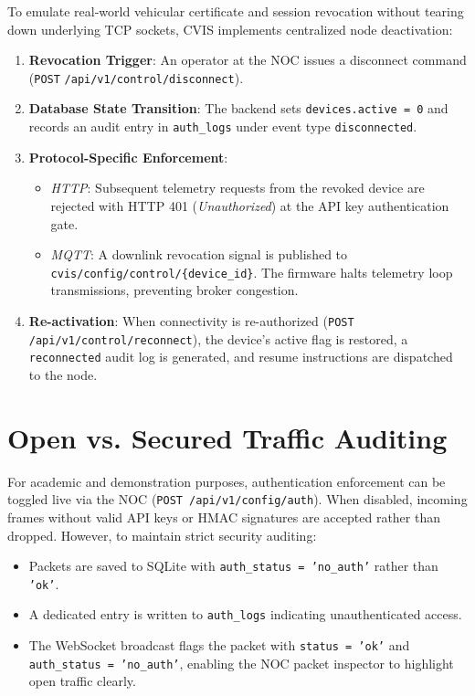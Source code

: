 \documentclass[12pt,a4paper]{report}
\begin{document}
To emulate real-world vehicular certificate and session revocation without tearing down underlying TCP sockets, CVIS implements centralized node deactivation:

\begin{enumerate}
  \item \textbf{Revocation Trigger}: An operator at the NOC issues a disconnect command (\texttt{POST} \nolinkurl{/api/v1/control/disconnect}).
  \item \textbf{Database State Transition}: The backend sets \texttt{devices.active = 0} and records an audit entry in \texttt{auth\_logs} under event type \texttt{disconnected}.
  \item \textbf{Protocol-Specific Enforcement}:
    \begin{itemize}
      \item \textit{HTTP}: Subsequent telemetry requests from the revoked device are rejected with HTTP 401 (\textit{Unauthorized}) at the API key authentication gate.
      \item \textit{MQTT}: A downlink revocation signal is published to \nolinkurl{cvis/config/control/{device_id}}. The firmware halts telemetry loop transmissions, preventing broker congestion.
    \end{itemize}
  \item \textbf{Re-activation}: When connectivity is re-authorized (\texttt{POST} \nolinkurl{/api/v1/control/reconnect}), the device's active flag is restored, a \texttt{reconnected} audit log is generated, and resume instructions are dispatched to the node.
\end{enumerate}

\section{Open vs. Secured Traffic Auditing}

For academic and demonstration purposes, authentication enforcement can be toggled live via the NOC (\texttt{POST /api/v1/config/auth}). When disabled, incoming frames without valid API keys or HMAC signatures are accepted rather than dropped. However, to maintain strict security auditing:
\begin{itemize}
  \item Packets are saved to SQLite with \texttt{auth\_status = 'no\_auth'} rather than \texttt{'ok'}.
  \item A dedicated entry is written to \texttt{auth\_logs} indicating unauthenticated access.
  \item The WebSocket broadcast flags the packet with \texttt{status = 'ok'} and \texttt{auth\_status = 'no\_auth'}, enabling the NOC packet inspector to highlight open traffic clearly.
\end{itemize}
\end{document}
